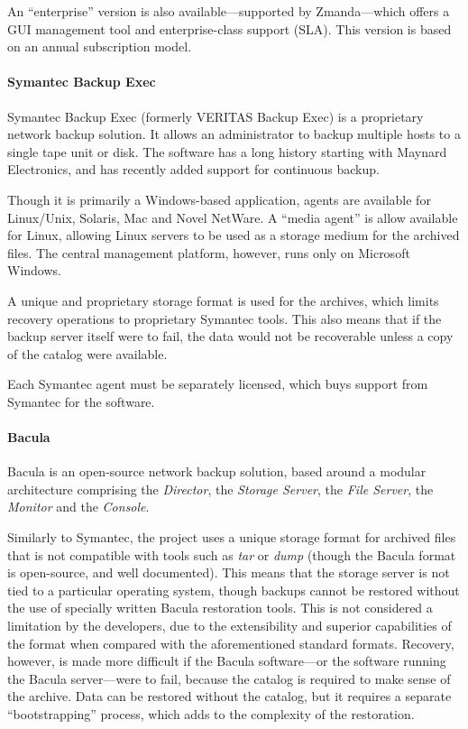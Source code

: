 \begin{bibunit}[plain]
An ``enterprise'' version is also available---supported by Zmanda---which
offers a GUI management tool and enterprise-class support (SLA).  This version
is based on an annual subscription model\cite{AMANDA-ent}.

\paragraph{Symantec Backup Exec}

Symantec Backup Exec (formerly VERITAS Backup Exec) is a proprietary network
backup solution. It allows an administrator to backup multiple hosts to
a single tape unit or disk. The software has a long history starting with
Maynard Electronics\cite{Symantec-history}, and has recently added support for
continuous backup\cite{Symantec-about}.

Though it is primarily a Windows-based application, agents are available for
Linux/Unix, Solaris, Mac and Novel NetWare. A ``media agent'' is allow
available for Linux, allowing Linux servers to be used as a storage medium for
the archived files. The central management platform, however, runs only on
Microsoft Windows\cite{Symantec-about}.

A unique and proprietary storage format is used for the archives, which limits
recovery operations to proprietary Symantec tools. This also means that if the
backup server itself were to fail, the data would not be recoverable unless
a copy of the catalog were available.

Each Symantec agent must be separately licensed, which buys support from
Symantec for the software\cite{Symantec-about}.

\paragraph{Bacula}

Bacula is an open-source network backup solution, based around a modular
architecture comprising the \emph{Director}, the \emph{Storage Server}, the
\emph{File Server}, the \emph{Monitor} and the
\emph{Console}\cite{Bacula-about}.

Similarly to Symantec, the project uses a unique storage format for archived
files that is not compatible with tools such as \emph{tar} or \emph{dump}
(though the Bacula format is open-source, and well documented). This means that
the storage server is not tied to a particular operating system, though backups
cannot be restored without the use of specially written Bacula restoration
tools. This is not considered a limitation by the developers, due to the
extensibility and superior capabilities of the format when compared with the
aforementioned standard formats\cite{Bacula-about}. Recovery, however, is made
more difficult if the Bacula software---or the software running the Bacula
server---were to fail, because the catalog is required to make sense of the
archive. Data can be restored without the catalog, but it requires a separate
``bootstrapping'' process, which adds to the complexity of the restoration.


\end{bibunit}
